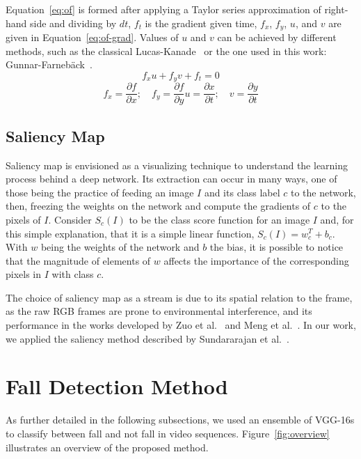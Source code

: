 \documentclass[conference]{IEEEtran}
\begin{document}
Equation~\ref{eq:of} is formed after applying a Taylor series approximation of right-hand side and dividing by $dt$, $f_t$ is the gradient given time, $f_x$, $f_y$, $u$, and $v$ are given in Equation~\ref{eq:of-grad}. Values of $u$ and $v$ can be achieved by different methods, such as the classical Lucas-Kanade~\cite{jain2018abnormal} or the one used in this work: Gunnar-Farneb{\"a}ck~\cite{lowhur2015dense}.
\begin{equation}
\label{eq:of}
f_xu + f_yv + f_t=0
\end{equation}
\begin{equation}
\label{eq:of-grad}
f_x = \frac{\partial f}{\partial x}; \quad f_y = \frac{\partial f}{\partial y}u = \frac{\partial x}{\partial t}; \quad v = \frac{\partial y}{\partial t}
\end{equation}

\subsection{Saliency Map}
\label{sec:saliency}

Saliency map is envisioned as a visualizing technique to understand the learning process behind a deep network. Its extraction can occur in many ways, one of those being the practice of feeding an image $I$ and its class label $c$ to the network, then, freezing the weights on the network and compute the gradients of $c$ to the pixels of $I$. Consider $S_c(I)$ to be the class score function for an image $I$ and, for this simple explanation, that it is a simple linear function, $S_c(I) = w_c^{T} + b_c$. With $w$ being the weights of the network and $b$ the bias, it is possible to notice that the magnitude of elements of $w$ affects the importance of the corresponding pixels in $I$ with class $c$.

The choice of saliency map as a stream is due to its spatial relation to the frame, as the raw RGB frames are prone to environmental interference, and its performance in the works developed by Zuo et al.~\cite{zuo2019enhanced} and Meng et al.~\cite{Meng2018interpretable}. In our work, we applied the saliency method described by Sundararajan et al.~\cite{sundararajan2017axiomatic}.

\section{Fall Detection Method}
\label{sec:method}

As further detailed in the following subsections, we used an ensemble of VGG-16s to classify between fall and not fall in video sequences. Figure~\ref{fig:overview} illustrates an overview of the proposed method.
\end{document}
